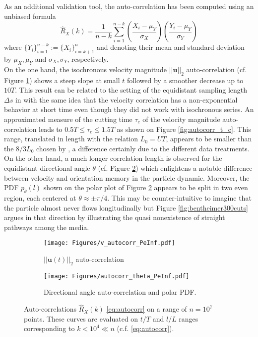 As an additional validation tool, the auto-correlation has been computed using an unbiased formula
\begin{equation}
\hat R_X(k) = \frac{1}{n-k} \sum_{i=1}^{n-k} \left(\frac{X_i-\mu_Y}{\sigma_X}\right)\left(\frac{Y_i-\mu_Y}{\sigma_Y}\right)
\label{eq:autocorr}
\end{equation}
where $\{Y_i\}_{i=1}^{n-k} := \{X_{i}\}_{i=k+1}^{n}$ and denoting their mean and standard deviation by $\mu_X,\mu_Y$ and $\sigma_X, \sigma_Y$, respectively.\\
On the one hand, the isochronous velocity magnitude $||\textbf{u}||_2$ auto-correlation (cf. Figure \ref{fig:autocorrv_peinf}) shows a steep slope at small $t$ followed by a smoother decrease up to $10T$.
This result can be related to the setting of the equidistant sampling length $\Delta s$ in \citet{Puyguiraud2019} with the same idea that the velocity correlation has a non-exponential behavior at short time even though they did not work with isochronous series. 
An approximated measure of the cutting time $\tau_c$ of the velocity magnitude auto-correlation leads to $0.5T \leq \tau_c \leq 1.5T$ as shown on Figure \ref{fig:autocorr_t_c}. 
This range, translated in length with the relation $L_0=U T$, appears to be smaller than the $8/3L_0$ chosen by \citet{Puyguiraud2019}, a difference certainly due to the different data treatments.\\
On the other hand, a much longer correlation length is observed for the equidistant directional angle $\theta$ (cf. Figure \ref{fig:autocorrt_peinf}) which enlightens a notable difference between velocity and orientation memory in the particle dynamic.
Moreover, the PDF $p_\theta(l)$ shown on the polar plot of Figure \ref{fig:autocorrt_peinf} appears to be split in two even region, each centered at $\theta\approx\pm\pi/4$. 
This may be counter-intuitive to imagine that the particle almost never flows longitudinally but Figure \ref{fig:bentheimer300cuts} argues in that direction by illustrating the quasi nonexistence of straight pathways among the media. \\
\begin{figure}
	\centering
	\begin{subfigure}[b]{0.49\textwidth}
		\centering
		\texttt{[image: Figures/v\_autocorr\_PeInf.pdf]}
		\caption{$||\textbf{u}(t)||_2$ auto-correlation}
		\label{fig:autocorrv_peinf}
	\end{subfigure}
	\hfill
	\begin{subfigure}[b]{0.49\textwidth}
		\centering
		\texttt{[image: Figures/autocorr\_theta\_PeInf.pdf]}
		\caption{Directional angle auto-correlation and polar PDF.}
		\label{fig:autocorrt_peinf}
	\end{subfigure}
	\caption{Auto-correlations $\hat{R}_X(k)$ \eqref{eq:autocorr} on a range of $n=10^7$ points. These curves are evaluated on $t/T$ and $l/L$ ranges corresponding to $k<10^4 \ll n$ (c.f. \eqref{eq:autocorr}).}
	\label{fig:autocorr_peinf}
\end{figure}
